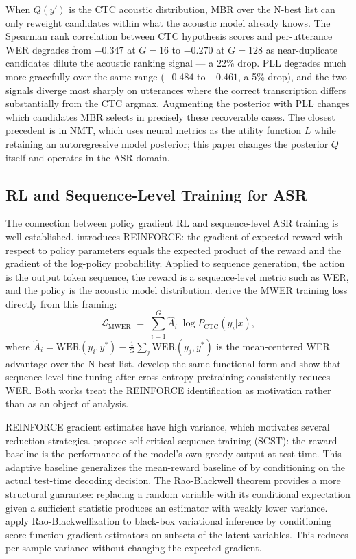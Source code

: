 When $Q(y')$ is the CTC acoustic distribution, MBR over the N-best list can only reweight candidates within what the acoustic model already knows. The Spearman rank correlation between CTC hypothesis scores and per-utterance WER degrades from $-0.347$ at $G=16$ to $-0.270$ at $G=128$ as near-duplicate candidates dilute the acoustic ranking signal — a 22\% drop. PLL degrades much more gracefully over the same range ($-0.484$ to $-0.461$, a 5\% drop), and the two signals diverge most sharply on utterances where the correct transcription differs substantially from the CTC argmax. Augmenting the posterior with PLL changes which candidates MBR selects in precisely these recoverable cases. The closest precedent is \citet{finkelstein2024mbr} in NMT, which uses neural metrics as the utility function $L$ while retaining an autoregressive model posterior; this paper changes the posterior $Q$ itself and operates in the ASR domain.



\subsection{RL and Sequence-Level Training for ASR}

The connection between policy gradient RL and sequence-level ASR training is well established. \citet{williams1992} introduces REINFORCE: the gradient of expected reward with respect to policy parameters equals the expected product of the reward and the gradient of the log-policy probability. Applied to sequence generation, the action is the output token sequence, the reward is a sequence-level metric such as WER, and the policy is the acoustic model distribution. \citet{prabhavalkar2018mwer} derive the MWER training loss directly from this framing:
\begin{equation*}
\mathcal{L}_\text{MWER} \;=\; \sum_{i=1}^{G} \hat{A}_i \;\log P_\text{CTC}(y_i|x),
\end{equation*}
where $\hat{A}_i = \text{WER}(y_i, y^*) - \frac{1}{G}\sum_{j} \text{WER}(y_j, y^*)$ is the mean-centered WER advantage over the N-best list. \citet{shannon2017} develop the same functional form and show that sequence-level fine-tuning after cross-entropy pretraining consistently reduces WER. Both works treat the REINFORCE identification as motivation rather than as an object of analysis.

REINFORCE gradient estimates have high variance, which motivates several reduction strategies. \citet{rennie2017self} propose self-critical sequence training (SCST): the reward baseline is the performance of the model's own greedy output at test time. This adaptive baseline generalizes the mean-reward baseline of \citet{williams1992} by conditioning on the actual test-time decoding decision. The Rao-Blackwell theorem \cite{casella1996rao} provides a more structural guarantee: replacing a random variable with its conditional expectation given a sufficient statistic produces an estimator with weakly lower variance. \citet{ranganath2014bbvi} apply Rao-Blackwellization to black-box variational inference by conditioning score-function gradient estimators on subsets of the latent variables. This reduces per-sample variance without changing the expected gradient.

